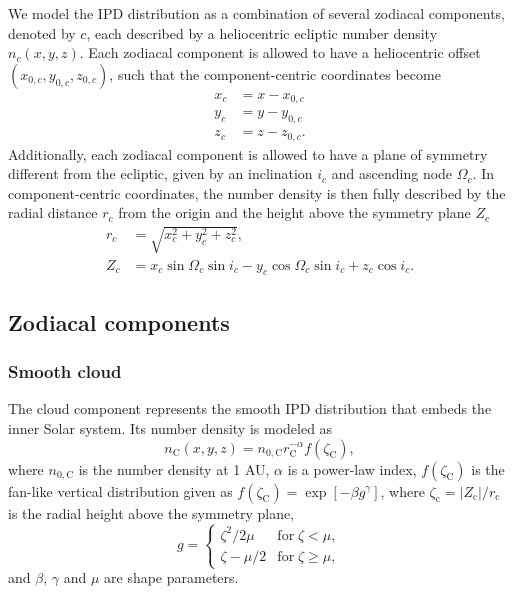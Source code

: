 \documentclass{aa}
\begin{document}
We model the IPD distribution as a combination of several zodiacal 
components, denoted by $c$, each described by a heliocentric ecliptic 
number density $n_c(x,y,z)$. Each zodiacal component is allowed to have 
a heliocentric offset $(x_{0,c}, y_{0,c}, z_{0,c})$, such that the 
component-centric coordinates become
\begin{equation}    
    \begin{aligned}
        x_c&= x - x_{0,c}\\
        y_c&= y - y_{0,c}\\
        z_c&= z - z_{0,c}.
    \end{aligned}
\end{equation}
Additionally, each zodiacal component is allowed to have a plane of 
symmetry different from the ecliptic, given by an inclination $i_c$ and 
ascending node $\Omega_c$. In component-centric coordinates, the number 
density is then fully described by the radial distance $r_c$ from the 
origin and the height above the symmetry plane $Z_c$
\begin{align}
    r_c &= \sqrt{x_c^2 + y_c^2 + z_c^2},\\
    Z_c &= x_c\sin{\Omega_c}\sin{i_c} - y_c \cos{\Omega_c}\sin{i_c} + z_c \cos{i_c}.
\end{align}


\subsection{Zodiacal components}
\subsubsection{Smooth cloud}
The cloud component represents the smooth IPD distribution that embeds 
the inner Solar system. Its number density is modeled as
\begin{equation}
    n_\mathrm{C}(x,y,z)=n_{0, \mathrm{C}}r_\mathrm{C}^{-\alpha}f(\zeta_\mathrm{C}),
\end{equation}
where $n_{0, \mathrm{C}}$ is the number density at 1 AU, $\alpha$ is a 
power-law index, $f(\zeta_\mathrm{C})$ is the fan-like vertical 
distribution given as 
$f(\zeta_\mathrm{C}) = \exp {\left[-\beta g^\gamma \right]}$, where 
$\zeta_\mathrm{c} = |Z_\mathrm{c}|/r_\mathrm{c}$ is the radial height 
above the symmetry plane, 
\begin{equation}
    g = \begin{cases}
        \zeta^2/2\mu & \mathrm{for}\; \zeta < \mu,\\
        \zeta - \mu/2 & \mathrm{for}\; \zeta \geq \mu,
    \end{cases}
\end{equation}
and  $\beta$, $\gamma$ and $\mu$ are shape parameters.
\end{document}
